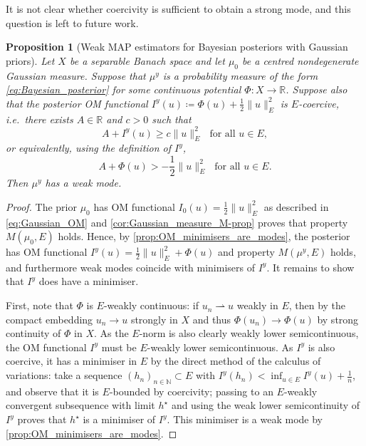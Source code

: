 \documentclass[11pt]{article}
\newcommand*{\defeq}{\coloneqq}
\newcommand*{\Naturals}{\mathbb{N}}
\newcommand*{\Reals}{\mathbb{R}}
\renewcommand*{\geq}{\geqslant}
\theoremstyle{plain}
\newtheorem{proposition}[theorem]{Proposition}
\theoremstyle{definition}
\newcommand{\norm}[1]{\lVert #1 \rVert}
\numberwithin{equation}{section}
\numberwithin{figure}{section}
\numberwithin{table}{section}
\begin{document}
It is not clear whether coercivity is sufficient to obtain a strong mode, and this question is left to future work.

\begin{proposition}[Weak MAP estimators for Bayesian posteriors with Gaussian priors]
	\label{prop:weak_modes}
	Let $X$ be a separable Banach space and let $\mu_0$ be a centred nondegenerate Gaussian measure.
	Suppose that $\mu^y$ is a \emph{probability measure} of the form \eqref{eq:Bayesian_posterior} for some continuous potential $\Phi \colon X \to \Reals$.
	Suppose also that the posterior OM functional $I^y(u) \defeq \Phi(u) + \frac{1}{2}\norm{u}_E^2$ is \emph{$E$-coercive}, i.e.\ there exists $A \in \Reals$ and $c > 0$ such that 
	\begin{equation*}
		A + I^y(u) \geq c\norm{u}_{E}^{2} \text{~~for all $u \in E$},
	\end{equation*}
	or equivalently, using the definition of $I^{y}$,
	\begin{equation*}
		A + \Phi(u) > -\frac{1}{2} \norm{u}_{E}^2 \text{~~for all $u \in E$.}
	\end{equation*}
	Then $\mu^y$ has a weak mode.
\end{proposition}

\begin{proof}
	The prior $\mu_0$ has OM functional $I_0(u) = \frac{1}{2}\norm{u}_{E}^{2}$ as described in \eqref{eq:Gaussian_OM} and \cref{cor:Gaussian_measure_M-prop} proves that property $M(\mu_0, E)$ holds.
	Hence, by \cref{prop:OM_minimisers_are_modes}, the posterior has OM functional $I^y(u) = \frac{1}{2} \norm{u}_{E}^{2} + \Phi(u)$ and property $M(\mu^y, E)$ holds, and furthermore weak modes coincide with minimisers of $I^y$.
	It remains to show that $I^y$ does have a minimiser.

	First, note that $\Phi$ is $E$-weakly continuous: 
	if $u_n \rightharpoonup u$ weakly in $E$, then by the compact embedding $u_n \to u$ strongly in $X$ and thus $\Phi(u_n) \to \Phi(u)$ by strong continuity of $\Phi$ in $X$.
	As the $E$-norm is also clearly weakly lower semicontinuous, the OM functional $I^y$ must be $E$-weakly lower semicontinuous.
	As $I^y$ is also coercive, it has a minimiser in $E$ by the direct method of the calculus of variations:
	take a sequence $(h_n)_{n \in \Naturals} \subset E$ with $I^y(h_n) < \inf_{u \in E} I^y(u) + \tfrac{1}{n}$, and observe that it is $E$-bounded by coercivity;
	passing to an $E$-weakly convergent subsequence with limit $h^{\star}$ and using the weak lower semicontinuity of $I^y$ proves that $h^{\star}$ is a minimiser of $I^y$.
	This minimiser is a weak mode by \cref{prop:OM_minimisers_are_modes}.
\end{proof}
\end{document}
